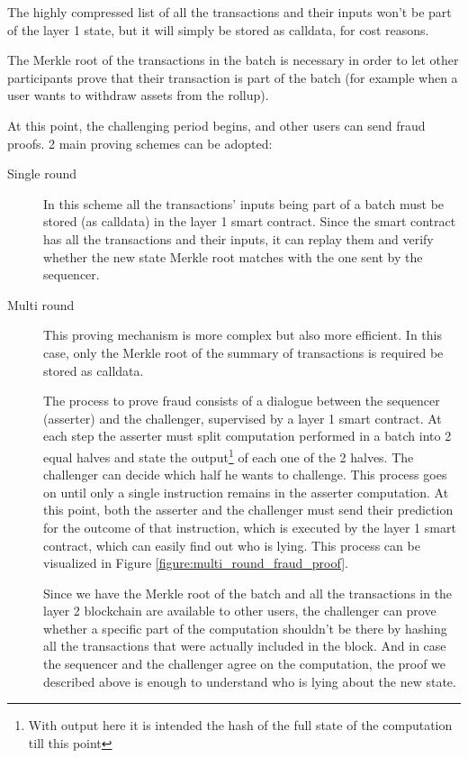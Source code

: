 \documentclass[11pt]{article}
\begin{document}
The highly compressed list of all the transactions and their inputs won't be part of the layer 1 state, but it will simply be stored as calldata, for cost reasons.

The Merkle root of the transactions in the batch is necessary in order to let other participants prove that their transaction is part of the batch (for example when a user wants to withdraw assets from the rollup).

At this point, the challenging period begins, and other users can send fraud proofs. 2 main proving schemes can be adopted:
\begin{description}
    \item[Single round] In this scheme all the transactions' inputs being part of a batch must be stored (as calldata) in the layer 1 smart contract. Since the smart contract has all the transactions and their inputs, it can replay them and verify whether the new state Merkle root matches with the one sent by the sequencer.
    \item[Multi round] This proving mechanism is more complex but also more efficient. In this case, only the Merkle root of the summary of transactions is required be stored as calldata.
                        
                        The process to prove fraud consists of a dialogue between the sequencer (asserter) and the challenger, supervised by a layer 1 smart contract. At each step the asserter must split computation performed in a batch into 2 equal halves and state the output\footnote{With output here it is intended the hash of the full state of the computation till this point} of each one of the 2 halves. The challenger can decide which half he wants to challenge.
                        This process goes on until only a single instruction remains in the asserter computation. At this point, both the asserter and the challenger must send their prediction for the outcome of that instruction, which is executed by the layer 1 smart contract, which can easily find out who is lying. This process can be visualized in Figure \ref{figure:multi_round_fraud_proof}.

                        Since we have the Merkle root of the batch and all the transactions in the layer 2 blockchain are available to other users, the challenger can prove whether a specific part of the computation shouldn't be there by hashing all the transactions that were actually included in the block. 
                        And in case the sequencer and the challenger agree on the computation, the proof we described above is enough to understand who is lying about the new state.
\end{description}
\end{document}
